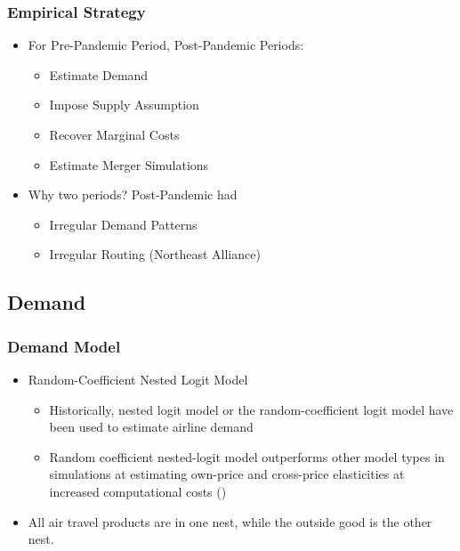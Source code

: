 \documentclass[xcolor=dvipsnames]{beamer}
\let\Oldsubsection\subsection
\renewcommand{\subsection}{\FloatBarrier\Oldsubsection}
\begin{document}
    \begin{frame}
        \frametitle{Empirical Strategy}
        \begin{itemize}
            \item For Pre-Pandemic Period, Post-Pandemic Periods:
            \begin{itemize}
                \item Estimate Demand
                \item Impose Supply Assumption
                \item Recover Marginal Costs
                \item Estimate Merger Simulations
            \end{itemize}
            \item Why two periods? Post-Pandemic had
            \begin{itemize}
                \item Irregular Demand Patterns 
                \item Irregular Routing (Northeast Alliance)
            \end{itemize}
        \end{itemize}
    \end{frame}
    
    \subsection{Demand}
    \begin{frame}
        \frametitle{Demand Model}
        \begin{itemize}
            \item Random-Coefficient Nested Logit Model 
            \begin{itemize}
                \item Historically, nested logit model or the random-coefficient logit model have been used to estimate airline demand 
                \item Random coefficient nested-logit model outperforms other model types in simulations at estimating own-price and cross-price elasticities at increased computational costs (\cite{grigolon_nested_2014})
            \end{itemize}
            \item All air travel products are in one nest, while the outside good is the other nest. 
        \end{itemize}
    \end{frame}
    
\end{document}
